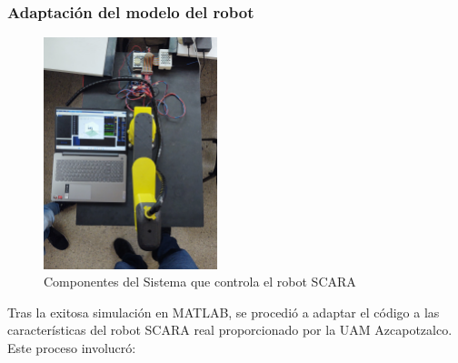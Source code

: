 \documentclass[final]{foresj}
\begin{document}
\subsubsection{Adaptación del modelo del robot}

\begin{figure}[h!]
\centering
\includegraphics[width=0.45\textwidth]{SCARA3.jpg}
\caption{Componentes del Sistema que controla el robot SCARA}
\label{fig:my_label}
\end{figure}

Tras la exitosa simulación en MATLAB, se procedió a adaptar el código a las características del robot SCARA real proporcionado por la UAM Azcapotzalco. Este proceso involucró:
\end{document}
